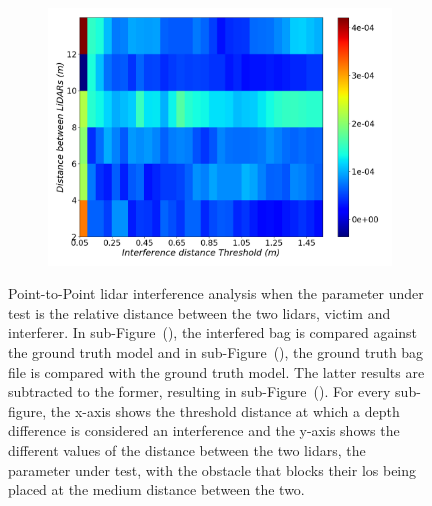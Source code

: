 \begin{figure}[!ht]
\begin{subfigure}[c]{0.45\textwidth}
	\label{fig:los:ground-truth-color-mesh}
\end{subfigure}
\\ \vspace{4mm}
\begin{subfigure}[c]{0.6\textwidth}
	\includegraphics[width=\textwidth]{img/lidar-interference/LOS/difference_ground_truth_interference_measurement.png}
\caption{}%
	\label{fig:los:difference-color-mesh}
\end{subfigure}

\caption[Point-to-Point analysis when the \acs{los} between the \acp{lidar} is obstructed and their relative distance is  variated.]{Point-to-Point \ac{lidar} interference analysis when the parameter under test is the relative distance between the two \acp{lidar}, victim and interferer. In sub-Figure~(), the interfered bag is compared against the ground truth model and in sub-Figure~(), the ground truth bag file is compared with the ground truth model. The latter results are subtracted to the former, resulting in sub-Figure~(). For every sub-figure, the x-axis shows the threshold distance at which a depth difference is considered an interference and the y-axis shows the different values of the distance between the two \acp{lidar}, the parameter under test, with the obstacle that blocks their \ac{los} being placed at the medium distance between the two.}
\label{fig:los:color-mesh}
\end{figure}

